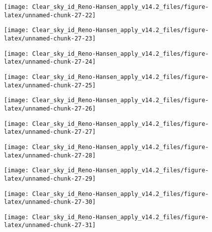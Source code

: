 \documentclass[
  10pt,
  a4paper,oneside]{article}
\begin{document}
\begin{center}\texttt{[image: Clear\_sky\_id\_Reno-Hansen\_apply\_v14.2\_files/figure-latex/unnamed-chunk-27-22]} \end{center}

\begin{center}\texttt{[image: Clear\_sky\_id\_Reno-Hansen\_apply\_v14.2\_files/figure-latex/unnamed-chunk-27-23]} \end{center}

\begin{center}\texttt{[image: Clear\_sky\_id\_Reno-Hansen\_apply\_v14.2\_files/figure-latex/unnamed-chunk-27-24]} \end{center}

\begin{center}\texttt{[image: Clear\_sky\_id\_Reno-Hansen\_apply\_v14.2\_files/figure-latex/unnamed-chunk-27-25]} \end{center}

\begin{center}\texttt{[image: Clear\_sky\_id\_Reno-Hansen\_apply\_v14.2\_files/figure-latex/unnamed-chunk-27-26]} \end{center}

\begin{center}\texttt{[image: Clear\_sky\_id\_Reno-Hansen\_apply\_v14.2\_files/figure-latex/unnamed-chunk-27-27]} \end{center}

\begin{center}\texttt{[image: Clear\_sky\_id\_Reno-Hansen\_apply\_v14.2\_files/figure-latex/unnamed-chunk-27-28]} \end{center}

\begin{center}\texttt{[image: Clear\_sky\_id\_Reno-Hansen\_apply\_v14.2\_files/figure-latex/unnamed-chunk-27-29]} \end{center}

\begin{center}\texttt{[image: Clear\_sky\_id\_Reno-Hansen\_apply\_v14.2\_files/figure-latex/unnamed-chunk-27-30]} \end{center}

\begin{center}\texttt{[image: Clear\_sky\_id\_Reno-Hansen\_apply\_v14.2\_files/figure-latex/unnamed-chunk-27-31]} \end{center}
\end{document}
